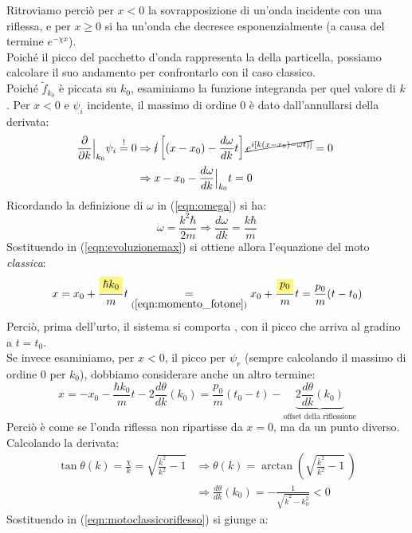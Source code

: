 \documentclass[../../FisicaTeorica.tex]{subfiles}
\begin{document}
Ritroviamo perciò per $x<0$ la sovrapposizione di un'onda incidente con una riflessa, e per $x\geq 0$ si ha un'onda che decresce esponenzialmente (a causa del termine $e^{-\chi x}$).\\
Poiché il picco del pacchetto d'onda rappresenta la  della particella, possiamo calcolare il suo andamento per confrontarlo con il caso classico.\\
Poiché $\tilde{f}_{k_0}$ è piccata su $k_0$, esaminiamo la funzione integranda per quel valore di $k$. Per $x<0$ e $\psi_i$ incidente, il massimo di ordine $0$ è dato dall'annullarsi della derivata:
\begin{align}
\frac{\partial}{\partial k}\Big|_{k_0} \psi_i\overset{!}{=}0 &\Rightarrow \cancel{i}\left [(x-x_0)-\frac{d \omega}{d k}t \right ]\cancel{e^{i[k(x-x_0)-\omega t)]}}=0\nonumber\ \\
&\Rightarrow x-x_0 -\frac{d\omega}{dk}\Big|_{k_0}t=0
\label{eqn:evoluzionemax}
\end{align}
Ricordando la definizione di $\omega$ in (\ref{eqn:omega}) si ha:
\[
\omega = \frac{k^2\hbar}{2m} \Rightarrow \frac{d\omega}{dk} = \frac{k\hbar}{m}
\]
Sostituendo in (\ref{eqn:evoluzionemax}) si ottiene allora l'equazione del moto \textit{classica}:
\[
x=x_0+\frac{\hlc{Yellow}{\hbar k_0}}{m}t\underset{(\ref{eqn:momento_fotone})}{=}x_0 + \frac{\hlc{Yellow}{p_0}}{m}t=\frac{p_0}{m}(t-t_0)
\]
Perciò, prima dell'urto, il sistema si comporta , con il picco che arriva al gradino a $t=t_0$.\\
Se invece esaminiamo, per $x<0$, il picco per $\psi_r$ (sempre calcolando il massimo di ordine $0$ per $k_0$), dobbiamo considerare anche un altro termine:
\begin{equation}
x=-x_0-\frac{\hbar k_0 }{m}t-2\frac{d\theta}{dk}(k_0) = \frac{p_0}{m}(t_0-t) - \underbrace{2\frac{d\theta}{dk}(k_0)}_{\text{offset della riflessione}}
\label{eqn:motoclassicoriflesso}
\end{equation}
Perciò è come se l'onda riflessa non ripartisse da $x=0$, ma da un punto diverso. Calcolando la derivata:
\begin{align*}
\tan\theta(k)=\frac{\chi}{k}=\sqrt{\frac{\bar{k}^2}{k^2}-1} &\Rightarrow \theta(k)=\arctan\left(
\sqrt{\frac{\bar{k}^2}{k^2}-1}\,
 \right)\\
&\Rightarrow \frac{d\theta}{dk}(k_0)=-\frac{1}{\sqrt{\bar{k}^2-k_0^2}} <0
\end{align*}
Sostituendo in (\ref{eqn:motoclassicoriflesso}) si giunge a:
\end{document}
